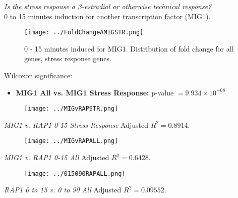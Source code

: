 \documentclass{beamer}
\begin{document}
\begin{frame}
    \emph{Is the stress response a $\beta$-estradiol or otherwise technical response?}\\

    {\scriptsize 0 to 15 minutes induction for another transcription factor (MIG1). }\\
    
    \begin{figure}[ht!]
        \centering
        \texttt{[image: ../FoldChangeAMIGSTR.png]}
        \caption{0 - 15 minutes induced for MIG1. Distribution of fold change for {\color{gray} all genes}, {\color{blue} stress response genes}.}
        \label{fig:targ4}
    \end{figure}

Wilcoxon significance:
    \begin{itemize}
        \item \textbf{MIG1 All vs. MIG1 Stress Response:} p-value $= 9.934 \times 10^{-08}$
    \end{itemize}
\end{frame}

\begin{frame}
    
    \begin{figure}[ht!]
        \centering
        \texttt{[image: ../MIGvRAPSTR.png]}
        \label{fig:targ5}
    \end{figure}


    {\footnotesize \emph{MIG1 v. RAP1 0-15 Stress Response} \hfill Adjusted $R^2 = 0.8914$.}
\end{frame}


\begin{frame}
    
    \begin{figure}[ht!]
        \centering
        \texttt{[image: ../MIGvRAPALL.png]}
        \label{fig:mig.rap.rib}
    \end{figure}

    {\footnotesize \emph{MIG1 v. RAP1 0-15 All} \hfill Adjusted $R^2 = 0.6428$.}
\end{frame}

\begin{frame}
    \begin{figure}[ht!]
        \centering
        \texttt{[image: ../015090RAPALL.png]}
        \label{fig:mig.rap.rib}
    \end{figure}

    {\footnotesize \emph{RAP1 0 to 15 v. 0 to 90 All} \hfill Adjusted $R^2 = 0.09552$.}
\end{frame}
\end{document}
